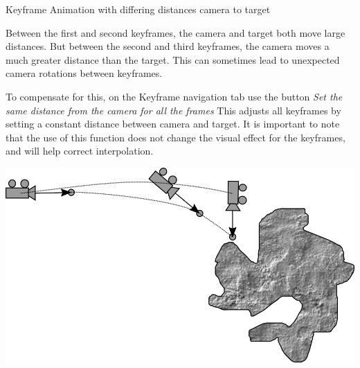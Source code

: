 Keyframe Animation with differing distances camera to target

Between the first and second keyframes, the camera and target both move large
distances. But between the second and third keyframes, the camera moves a much
greater distance than the target. This can sometimes lead to unexpected camera
rotations between keyframes.

To compensate for this, on the Keyframe navigation tab use the button \emph{Set the
same distance from the camera for all the frames} This adjusts all keyframes by
setting a constant distance between camera and target. It is important to note
that the use of this function does not change the visual effect for the
keyframes, and will help correct interpolation.

\includegraphics[width=0.7\linewidth]{img/manual/media/camera_target_tracking_2.png}
